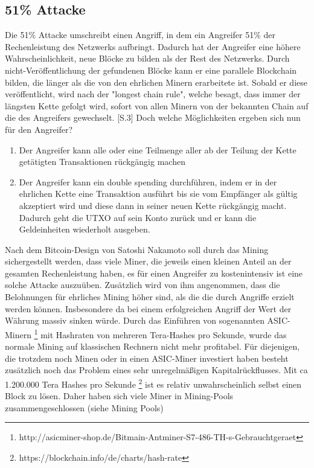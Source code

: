 \subsection{51\% Attacke}
Die 51\% Attacke umschreibt einen Angriff, in dem ein Angreifer 51\% der Rechenleistung des Netzwerks aufbringt. Dadurch hat der Angreifer eine höhere Wahrscheinlichkeit, neue Blöcke zu bilden als der Rest des Netzwerks. Durch nicht-Veröffentlichung der gefundenen Blöcke kann er eine parallele Blockchain bilden, die länger als die von den ehrlichen Minern erarbeitete ist. Sobald er diese veröffentlicht, wird nach der "longest chain rule", welche besagt, dass immer der längsten Kette gefolgt wird, sofort von allen Minern von der bekannten Chain auf die des Angreifers gewechselt. \cite{Nakamoto.31.10.2008}[S.3] Doch welche Möglichkeiten ergeben sich nun für den Angreifer?
\begin{enumerate}
	\item Der Angreifer kann alle oder eine Teilmenge aller ab der Teilung der Kette getätigten Transaktionen rückgängig machen
	\item Der Angreifer kann ein \glqq double spending\grqq{} durchführen, indem er in der \glqq ehrlichen\grqq{} Kette eine Transaktion ausführt bis sie vom Empfänger als gültig akzeptiert wird und diese dann in seiner \glqq neuen\grqq{} Kette rückgängig macht. Dadurch geht die \ac{UTXO} auf sein Konto zurück und er kann die Geldeinheiten wiederholt ausgeben.
\end{enumerate}

Nach dem Bitcoin-Design von Satoshi Nakamoto soll durch das Mining sichergestellt werden, dass viele Miner, die jeweils einen kleinen Anteil an der gesamten Rechenleistung haben, es für einen Angreifer zu kostenintensiv ist eine solche Attacke auszuüben. Zusätzlich wird von ihm angenommen, dass die Belohnungen für ehrliches Mining höher sind, als die die durch Angriffe erzielt werden können. Insbesondere da bei einem erfolgreichen Angriff der Wert der Währung massiv sinken würde.
 Durch das Einführen von sogenannten ASIC-Minern \footnote{http://asicminer-shop.de/Bitmain-Antminer-S7-486-TH-s-Gebrauchtgeraet} mit Hashraten von mehreren Tera-Hashes pro Sekunde, wurde das normale Mining auf klassischen Rechnern nicht mehr profitabel. 
Für diejenigen, die trotzdem noch Minen oder in einen ASIC-Miner investiert haben besteht zusätzlich noch das Problem eines sehr unregelmäßigen Kapitalrückflusses. Mit ca 1.200.000 Tera Hashes pro Sekunde \footnote{https://blockchain.info/de/charts/hash-rate} ist es relativ unwahrscheinlich selbst einen Block zu lösen. Daher haben sich viele Miner in Mining-Pools zusammengeschlossen (siehe Mining Pools) 

